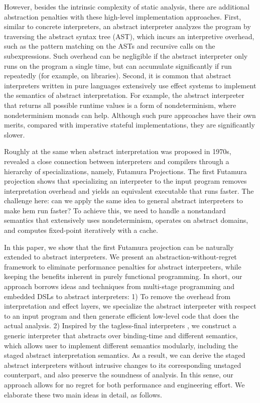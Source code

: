 However, besides the intrinsic complexity of static analysis, there
are additional abstraction penalties with these high-level
implementation approaches. First, similar to concrete interpreters,
an abstract interpreter analyzes the program by traversing the
abstract syntax tree (AST), which incurs an interpretive overhead, such
as the pattern matching on the ASTs and recursive calls on the
subexpressions.
Such overhead can be negligible if the abstract interpreter only runs
on the program a single time, but can accumulate significantly if
run repeatedly (for example, on libraries).  Second, it is common that
abstract interpreters written in pure languages extensively use effect
systems to implement the semantics of abstract interpretation. For
example, the abstract interpreter that returns all possible runtime
values is a form of nondeterminism, where nondeterminism monads can
help.  Although such pure approaches have their own merits, compared
with imperative stateful implementations, they are significantly
slower.

Roughly at the same when abstract interpretation was proposed in
1970s, \citet{futamura1971partial, Futamura1999} revealed a close
connection between interpreters and compilers through a hierarchy of
specializations, namely, Futamura Projections. The first Futamura
projection shows that specializing an interpreter to the input program
removes interpretation overhead and yields an equivalent executable
that runs faster.  The challenge here: can we apply the same idea to
general abstract interpreters to make hem run faster?
To achieve this, we need to handle a nonstandard semantics that
extensively uses nondeterminism, operates on abstract domains, and
computes fixed-point iteratively with a cache.

In this paper, we show that the first Futamura projection can be naturally
extended to abstract interpreters. We present an abstraction-without-regret
framework to eliminate performance penalties for abstract interpreters, while
keeping the benefits inherent in purely functional programming. In short, our
approach borrows ideas and techniques from multi-stage programming and embedded
DSLs to abstract interpreters:  1) To remove the overhead from interpretation
and effect layers, we specialize the abstract interpreter with respect to an
input program and then generate efficient low-level code that does the actual
analysis.  2) Inspired by the tagless-final interpreters
\cite{DBLP:journals/jfp/CaretteKS09}, we construct a generic interpreter that
abstracts over binding-time and different semantics, which allows user to
implement different semantics modularly, including the staged abstract
interpretation semantics. As a result, we can derive the staged abstract
interpreters without intrusive changes to its corresponding unstaged
counterpart, and also preserve the soundness of analysis. In this sense, our
approach allows for no regret for both performance and engineering effort. We
elaborate these two main ideas in detail, as follows.


